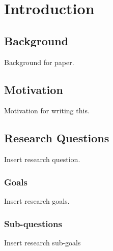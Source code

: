 
\chapter{Introduction} %

\label{Introduction} %



\section{Background}
Background for paper.


\section{Motivation}
Motivation for writing this.


\section{Research Questions}
Insert research question.

\subsection{Goals}
Insert research goals.

\subsection{Sub-questions}
Insert research sub-goals

